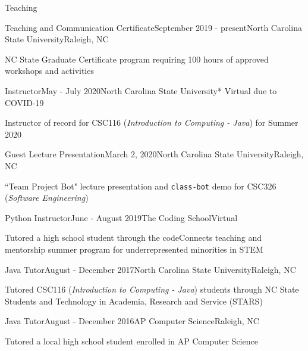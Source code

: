\documentclass{resume} %
\begin{document}
\begin{rSection}{Teaching}

\begin{rSubsection}{Teaching and Communication Certificate}{September 2019 - present}{North Carolina State University}{Raleigh, NC}
\item NC State Graduate Certificate program requiring 100 hours of approved workshops and activities
\end{rSubsection}
\vspace{-5pt}
\begin{rSubsection}{Instructor}{May - July 2020}{North Carolina State University}{* Virtual due to COVID-19}
\item Instructor of record for \textsc{CSC116} (\textit{Introduction to Computing - Java}) for Summer 2020
\end{rSubsection}
\vspace{-5pt}
\begin{rSubsection}{Guest Lecture Presentation}{March 2, 2020}{North Carolina State University}{Raleigh, NC}
\item ``Team Project Bot" lecture presentation and \texttt{class-bot} demo for \textsc{CSC326} (\textit{Software Engineering})
\end{rSubsection}
\vspace{-5pt}
\begin{rSubsection}{Python Instructor}{June - August 2019}{The Coding School}{Virtual}
\item Tutored a high school student through the codeConnects teaching and mentorship summer program for underrepresented minorities in STEM
\end{rSubsection}
\vspace{-5pt}

\begin{rSubsection}{Java Tutor}{August - December 2017}{North Carolina State University}{Raleigh, NC}
\item Tutored CSC116 (\textit{Introduction to Computing - Java}) students through NC State Students and Technology in Academia, Research and Service (STARS)
\end{rSubsection}
\vspace{-5pt}
\begin{rSubsection}{Java Tutor}{August - December 2016}{AP Computer Science}{Raleigh, NC}
\item Tutored a local high school student enrolled in AP Computer Science 
\end{rSubsection}
\vspace{-5pt}


\end{rSection}
\end{document}
